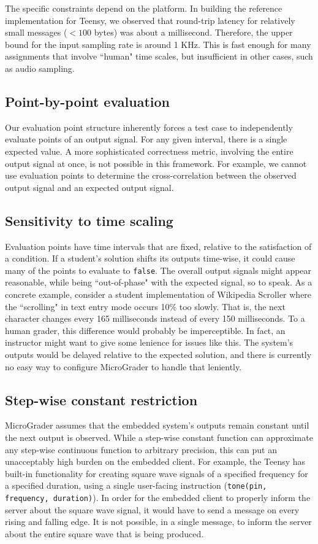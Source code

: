 \documentclass[12pt]{article}
\begin{document}
The specific constraints depend on the platform.  In building the reference implementation for Teensy, we observed that round-trip latency for relatively small messages ($<100$ bytes) was about a millisecond.  Therefore, the upper bound for the input sampling rate is around 1 KHz.  This is fast enough for many assignments that involve ``human" time scales, but insufficient in other cases, such as audio sampling.

\subsection{Point-by-point evaluation}
Our evaluation point structure inherently forces a test case to independently evaluate points of an output signal.  For any given interval, there is a single expected value.   A more sophisticated correctness metric, involving the entire output signal at once, is not possible in this framework.  For example, we cannot use evaluation points to determine the cross-correlation between the observed output signal and an expected output signal.

\subsection{Sensitivity to time scaling}
Evaluation points have time intervals that are fixed, relative to the satisfaction of a condition.  If a student's solution shifts its outputs time-wise, it could cause many of the points to evaluate to \texttt{false}.  The overall output signals might appear reasonable, while being ``out-of-phase" with the expected signal, so to speak.  As a concrete example, consider a student implementation of Wikipedia Scroller where the ``scrolling" in text entry mode occurs 10\% too slowly.  That is, the next character changes every 165 milliseconds instead of every 150 milliseconds.  To a human grader, this difference would probably be imperceptible.  In fact, an instructor might want to give some lenience for issues like this.  The system's outputs would be delayed relative to the expected solution, and there is currently no easy way to configure MicroGrader to handle that leniently.

\subsection{Step-wise constant restriction}
MicroGrader assumes that the embedded system's outputs remain constant until the next output is observed.  While a step-wise constant function can approximate any step-wise continuous function to arbitrary precision, this can put an unacceptably high burden on the embedded client.  For example, the Teensy has built-in functionality for creating square wave signals of a specified frequency for a specified duration, using a single user-facing instruction (\texttt{tone(pin, frequency, duration)}).  In order for the embedded client to properly inform the server about the square wave signal, it would have to send a message on every rising and falling edge.  It is not possible, in a single message, to inform the server about the entire square wave that is being produced.
\end{document}
